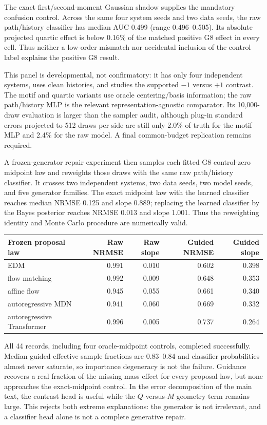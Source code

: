 The exact first/second-moment Gaussian shadow supplies the mandatory confusion
control.  Across the same four system seeds and two data seeds, the raw
path/history classifier has median AUC 0.499 (range 0.496--0.505).  Its absolute
projected quartic effect is below 0.16\% of the matched positive G8 effect in every
cell.  Thus neither a low-order mismatch nor accidental inclusion of the control
label explains the positive G8 result.

This panel is developmental, not confirmatory: it has only four independent
systems, uses clean histories, and studies the supported $-1$ versus $+1$
contrast.  The motif and quartic variants use oracle centering/basis information;
the raw path/history MLP is the relevant representation-agnostic comparator.  Its
10,000-draw evaluation is larger than the sampler audit, although plug-in standard
errors projected to 512 draws per side are still only 2.0\% of truth for the
motif MLP and 2.4\% for the raw model.  A final common-budget replication remains
required.

A frozen-generator repair experiment then samples each fitted G8 control-zero
midpoint law and reweights those draws with the same raw path/history classifier.
It crosses two independent systems, two data seeds, two model seeds, and five
generator families.  The exact midpoint law with the learned classifier reaches
median NRMSE 0.125 and slope 0.889; replacing the learned classifier by the Bayes
posterior reaches NRMSE 0.013 and slope 1.001.  Thus the reweighting identity and
Monte Carlo procedure are numerically valid.

\begin{center}
\begin{tabular}{@{}lrrrr@{}}
\toprule
Frozen proposal law & Raw NRMSE & Raw slope & Guided NRMSE & Guided slope \\
\midrule
EDM & 0.991 & 0.010 & 0.602 & 0.398 \\
flow matching & 0.992 & 0.009 & 0.648 & 0.353 \\
affine flow & 0.945 & 0.055 & 0.661 & 0.340 \\
autoregressive MDN & 0.941 & 0.060 & 0.669 & 0.332 \\
autoregressive Transformer & 0.996 & 0.005 & 0.737 & 0.264 \\
\bottomrule
\end{tabular}
\end{center}

All 44 records, including four oracle-midpoint controls, completed successfully.
Median guided effective sample fractions are 0.83--0.84 and classifier
probabilities almost never saturate, so importance degeneracy is not the failure.
Guidance recovers a real fraction of the missing mass effect for every proposal
law, but none approaches the exact-midpoint control.  In the error decomposition
of the main text, the contrast head is useful while the $Q$-versus-$M$ geometry
term remains large.  This rejects both extreme explanations: the generator is not
irrelevant, and a classifier head alone is not a complete generative repair.

